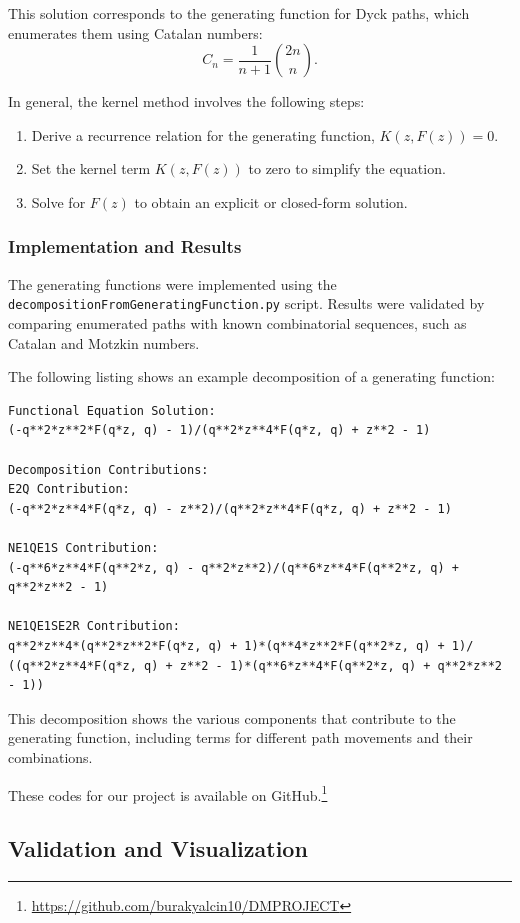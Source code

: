 \documentclass{article}
\begin{document}
This solution corresponds to the generating function for Dyck paths, which enumerates them using Catalan numbers:
\[
C_n = \frac{1}{n+1} \binom{2n}{n}.
\]

In general, the kernel method involves the following steps:
\begin{enumerate}
    \item Derive a recurrence relation for the generating function, $K(z, F(z)) = 0$.
    \item Set the kernel term $K(z, F(z))$ to zero to simplify the equation.
    \item Solve for $F(z)$ to obtain an explicit or closed-form solution.
\end{enumerate}


\subsubsection{Implementation and Results}
The generating functions were implemented using the \texttt{decompositionFromGeneratingFunction.py} script. Results were validated by comparing enumerated paths with known combinatorial sequences, such as Catalan and Motzkin numbers.

The following listing shows an example decomposition of a generating function:

\begin{lstlisting}[caption={Generating function decomposition for Dyck and Motzkin paths}]
Functional Equation Solution:
(-q**2*z**2*F(q*z, q) - 1)/(q**2*z**4*F(q*z, q) + z**2 - 1)

Decomposition Contributions:
E2Q Contribution: 
(-q**2*z**4*F(q*z, q) - z**2)/(q**2*z**4*F(q*z, q) + z**2 - 1)

NE1QE1S Contribution: 
(-q**6*z**4*F(q**2*z, q) - q**2*z**2)/(q**6*z**4*F(q**2*z, q) + q**2*z**2 - 1)

NE1QE1SE2R Contribution:
q**2*z**4*(q**2*z**2*F(q*z, q) + 1)*(q**4*z**2*F(q**2*z, q) + 1)/
((q**2*z**4*F(q*z, q) + z**2 - 1)*(q**6*z**4*F(q**2*z, q) + q**2*z**2 - 1))
\end{lstlisting}

This decomposition shows the various components that contribute to the generating function, including terms for different path movements and their combinations.

These codes for our project is available on GitHub.\footnote{\url{https://github.com/burakyalcin10/DMPROJECT}}

\subsection{Validation and Visualization}
\end{document}
